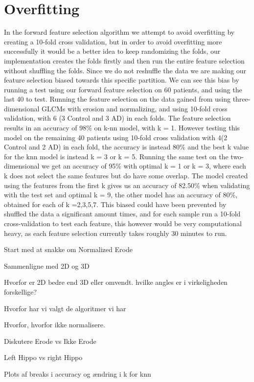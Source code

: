 \section{Overfitting}
In the forward feature selection algorithm we attempt to avoid overfitting by creating a 10-fold cross validation, but in order to avoid overfitting more successfully it would be a better idea to keep randomizing the folds, our implementation creates the folds firstly and then run the entire feature selection without shuffling the folds. Since we do not reshuffle the data we are making our feature selection biased towards this specific partition. We can see this bias by running a test using our forward feature selection on 60 patients, and using the last 40 to test.
Running the feature selection on the data gained from using three-dimensional GLCMs with erosion and normalizing, and using 10-fold cross validation, with 6 (3 Control and 3 AD) in each folds. The feature selection results in an accuracy of 98\% on k-nn model, with k = 1. However testing this model on the remaining 40 patients using 10-fold cross validation with 4(2 Control and 2 AD) in each fold, the accuracy is instead 80\% and the best k value for the knn model is instead  k = 3 or k = 5.
Running the same test on the two-dimensional we get an accuracy of 95\% with optimal k = 1 or k = 3, where each k does not select the same features but do have some overlap. The model created using the features from the first k gives us an accuracy of 82.50\% when validating with the test set and optimal k = 9, the other model has an accuracy of 80\%, obtained for each of k ={2,3,5,7}.
This biased could have been prevented by shuffled the data a significant amount times, and for each sample run a 10-fold cross-validation to test each feature, this however would be very computational heavy, as each feature selection currently takes roughly 30 minutes to run.




Start med at snakke om Normalized Erode

Sammenligne med 2D og 3D

Hvorfor er 2D bedre end 3D eller omvendt. hvilke angles er i virkeligheden forskellige?



Hvorfor har vi valgt de algoritmer vi har

Hvorfor, hvorfor ikke normalisere.

Diskutere Erode vs Ikke Erode

Left Hippo vs right Hippo


Plots af breaks i accuracy og ændring i k for knn 